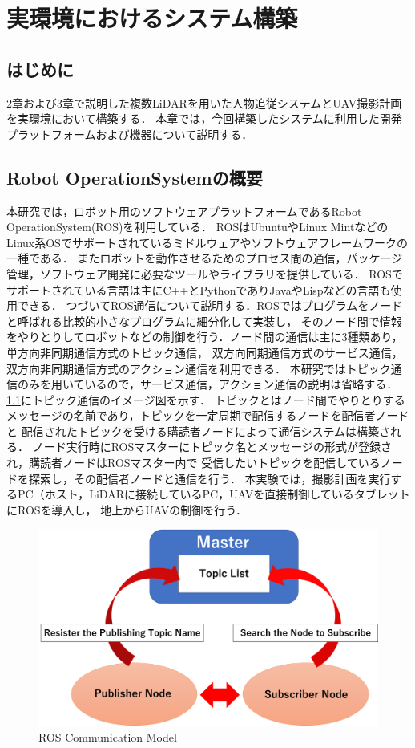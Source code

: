 \documentclass[autodetect-engine,dvipdfmx-if-dvi,ja=standard,a4j,jbase=11pt,magstyle=nomag*]{bxjsreport}
\begin{document}
\chapter[実環境におけるシステム構築]{実環境におけるシステム構築}

\section{はじめに}
2章および3章で説明した複数LiDARを用いた人物追従システムとUAV撮影計画を実環境において構築する．
本章では，今回構築したシステムに利用した開発プラットフォームおよび機器について説明する．


\section{Robot OperationSystemの概要}
本研究では，ロボット用のソフトウェアプラットフォームであるRobot OperationSystem(ROS)を利用している．
ROSはUbuntuやLinux MintなどのLinux系OSでサポートされているミドルウェアやソフトウェアフレームワークの一種である．
またロボットを動作させるためのプロセス間の通信，パッケージ管理，ソフトウェア開発に必要なツールやライブラリを提供している．
ROSでサポートされている言語は主にC++とPythonでありJavaやLispなどの言語も使用できる．
つづいてROS通信について説明する．ROSではプログラムをノードと呼ばれる比較的小さなプログラムに細分化して実装し，
そのノード間で情報をやりとりしてロボットなどの制御を行う．ノード間の通信は主に3種類あり，単方向非同期通信方式のトピック通信，
双方向同期通信方式のサービス通信，双方向非同期通信方式のアクション通信を利用できる．
本研究ではトピック通信のみを用いているので，サービス通信，アクション通信の説明は省略する．
\cref{fig:ros}にトピック通信のイメージ図を示す．
トピックとはノード間でやりとりするメッセージの名前であり，トピックを一定周期で配信するノードを配信者ノードと
配信されたトピックを受ける購読者ノードによって通信システムは構築される．
ノード実行時にROSマスターにトピック名とメッセージの形式が登録され，購読者ノードはROSマスター内で
受信したいトピックを配信しているノードを探索し，その配信者ノードと通信を行う．
本実験では，撮影計画を実行するPC（ホスト，LiDARに接続しているPC，UAVを直接制御しているタブレットにROSを導入し，
地上からUAVの制御を行う．

\begin{figure}[h]
    \centering
    \includegraphics[width=1.0\linewidth, clip]{./figure/chapter4/ros.png}
    \caption{ROS Communication Model}
    \label{fig:ros}
\end{figure}
\end{document}
